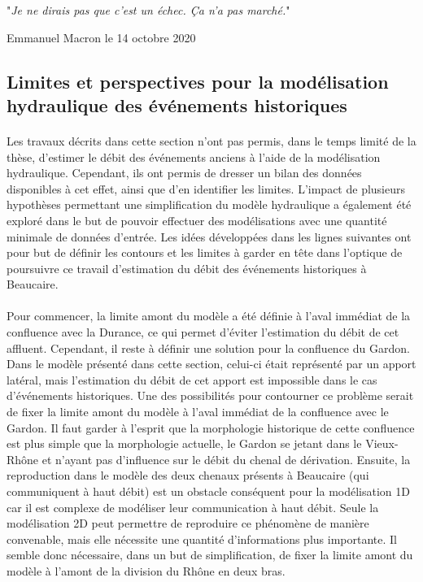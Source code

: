	\epigraph{"\textit{Je ne dirais pas que c'est un échec. Ça n'a pas marché.}"}{Emmanuel Macron le 14 octobre 2020}
		
	\FloatBarrier	
	\subsection{Limites et perspectives pour la modélisation hydraulique des événements historiques}
	
	\paragraph{} Les travaux décrits dans cette section n'ont pas permis, dans le temps limité de la thèse, d'estimer le débit des événements anciens à l'aide de la modélisation hydraulique. Cependant, ils ont permis de dresser un bilan des données disponibles à cet effet, ainsi que d'en identifier les limites. L'impact de plusieurs hypothèses permettant une simplification du modèle hydraulique a également été exploré dans le but de pouvoir effectuer des modélisations avec une quantité minimale de données d'entrée. Les idées développées dans les lignes suivantes ont pour but de définir les contours et les limites à garder en tête dans l'optique de poursuivre ce travail d'estimation du débit des événements historiques à Beaucaire.
	
	\paragraph{} Pour commencer, la limite amont du modèle a été définie à l'aval immédiat de la confluence avec la Durance, ce qui permet d'éviter l'estimation du débit de cet affluent. Cependant, il reste à définir une solution pour la confluence du Gardon. Dans le modèle présenté dans cette section, celui-ci était représenté par un apport latéral, mais l'estimation du débit de cet apport est impossible dans le cas d'événements historiques. Une des possibilités pour contourner ce problème serait de fixer la limite amont du modèle à l'aval immédiat de la confluence avec le Gardon. Il faut garder à l'esprit que la morphologie historique de cette confluence est plus simple que la morphologie actuelle, le Gardon se jetant dans le Vieux-Rhône et n'ayant pas d'influence sur le débit du chenal de dérivation. Ensuite, la reproduction dans le modèle des deux chenaux présents à Beaucaire (qui communiquent à haut débit) est un obstacle conséquent pour la modélisation 1D car il est complexe de modéliser leur communication à haut débit. Seule la modélisation 2D peut permettre de reproduire ce phénomène de manière convenable, mais elle nécessite une quantité d'informations plus importante. Il semble donc nécessaire, dans un but de simplification, de fixer la limite amont du modèle à l'amont de la division du Rhône en deux bras. 
	
